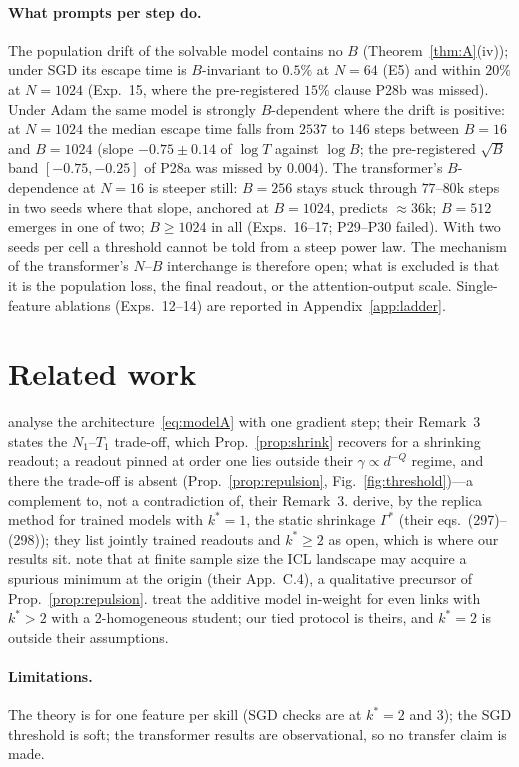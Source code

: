 \paragraph{What prompts per step do.}
The population drift of the solvable model contains no $B$ (Theorem~\ref{thm:A}(iv)); under SGD its escape time is $B$-invariant to $0.5\%$ at $N=64$ (E5)
and within $20\%$ at $N=1024$ (Exp.~15, where the pre-registered $15\%$ clause P28b was missed). Under Adam the same model is strongly $B$-dependent where
the drift is positive: at $N=1024$ the median escape time falls from $2537$ to $146$ steps between $B=16$ and $B=1024$ (slope $-0.75\pm0.14$ of $\log T$
against $\log B$; the pre-registered $\sqrt B$ band $[-0.75,-0.25]$ of P28a was missed by $0.004$). The transformer's $B$-dependence at $N=16$ is steeper still: $B=256$ stays stuck through $77$--$80$k steps in
two seeds where that slope, anchored at $B=1024$, predicts $\approx36$k; $B=512$ emerges in one of two; $B\ge1024$ in all (Exps.~16--17; P29--P30 failed).
With two seeds per cell a threshold cannot be told from a steep power law. The mechanism of the transformer's $N$--$B$ interchange is therefore open;
what is excluded is that it is the population loss, the final readout, or the attention-output scale. Single-feature ablations (Exps.~12--14) are reported in Appendix~\ref{app:ladder}.

\section{Related work}
\label{sec:related}
\citet{oko2024pretrained} analyse the architecture~\eqref{eq:modelA} with one gradient step; their Remark~3 states the $N_1$--$T_1$ trade-off, which Prop.~\ref{prop:shrink} recovers for a shrinking readout; a readout pinned at order one lies outside their $\gamma\propto d^{-Q}$ regime, and there the trade-off is absent (Prop.~\ref{prop:repulsion}, Fig.~\ref{fig:threshold})---a complement to, not a contradiction of, their Remark~3. \citet{gu2026incontext} derive, by the replica method for trained models with $k^*=1$, the static shrinkage $\Gamma^*$ (their eqs.~(297)--(298)); they list jointly trained readouts
and $k^*\ge2$ as open, which is where our results sit. \citet{kim2024transformers} note that at finite sample size the ICL landscape may acquire a spurious minimum at the
origin (their App.~C.4), a qualitative precursor of Prop.~\ref{prop:repulsion}. \citet{ren2025emergence} treat the additive model
in-weight for even links with $k^*>2$ with a 2-homogeneous student; our tied protocol is theirs, and $k^*=2$ is outside their assumptions.

\paragraph{Limitations.} The theory is for one feature per skill (SGD checks are at $k^*=2$ and $3$); the SGD threshold is soft; the transformer results are observational, so no transfer claim is made.
